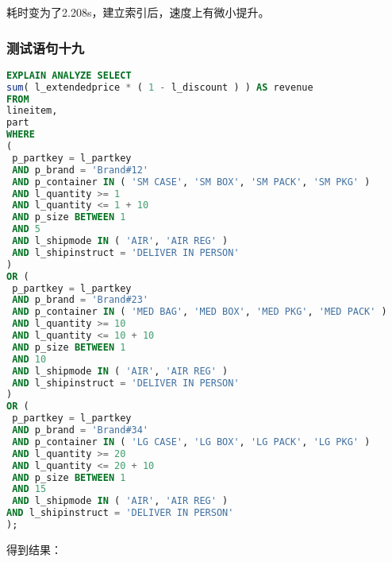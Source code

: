 \documentclass{article}
\begin{document}
耗时变为了2.208s，建立索引后，速度上有微小提升。

\subsubsection{测试语句十九}

\begin{lstlisting}[language=sql]
EXPLAIN ANALYZE SELECT
sum( l_extendedprice * ( 1 - l_discount ) ) AS revenue 
FROM
lineitem,
part 
WHERE
(
 p_partkey = l_partkey 
 AND p_brand = 'Brand#12' 
 AND p_container IN ( 'SM CASE', 'SM BOX', 'SM PACK', 'SM PKG' ) 
 AND l_quantity >= 1 
 AND l_quantity <= 1 + 10 
 AND p_size BETWEEN 1 
 AND 5 
 AND l_shipmode IN ( 'AIR', 'AIR REG' ) 
 AND l_shipinstruct = 'DELIVER IN PERSON' 
) 
OR (
 p_partkey = l_partkey 
 AND p_brand = 'Brand#23' 
 AND p_container IN ( 'MED BAG', 'MED BOX', 'MED PKG', 'MED PACK' ) 
 AND l_quantity >= 10 
 AND l_quantity <= 10 + 10 
 AND p_size BETWEEN 1 
 AND 10 
 AND l_shipmode IN ( 'AIR', 'AIR REG' ) 
 AND l_shipinstruct = 'DELIVER IN PERSON' 
) 
OR (
 p_partkey = l_partkey 
 AND p_brand = 'Brand#34' 
 AND p_container IN ( 'LG CASE', 'LG BOX', 'LG PACK', 'LG PKG' ) 
 AND l_quantity >= 20 
 AND l_quantity <= 20 + 10 
 AND p_size BETWEEN 1 
 AND 15 
 AND l_shipmode IN ( 'AIR', 'AIR REG' ) 
AND l_shipinstruct = 'DELIVER IN PERSON' 
);
\end{lstlisting}

得到结果：
\end{document}
